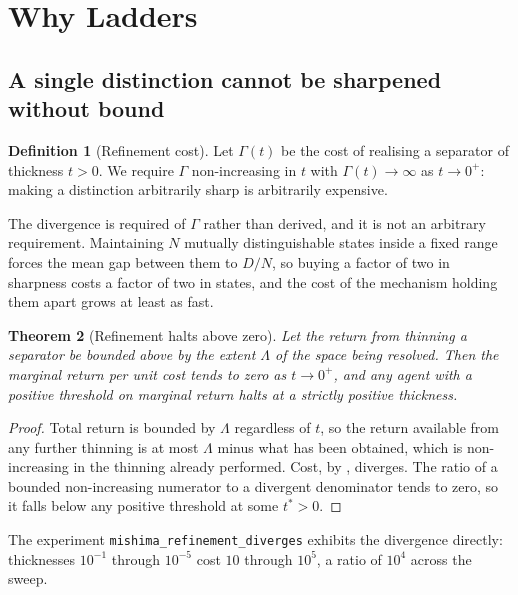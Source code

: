 \documentclass[11pt,twocolumn,a4paper]{article}
\newtheorem{theorem}{Theorem}[section]
\theoremstyle{definition}
\newtheorem{definition}[theorem]{Definition}
\theoremstyle{remark}
\begin{document}
\section{Why Ladders}
\label{sec:nesting}

\subsection{A single distinction cannot be sharpened without bound}

\begin{definition}[Refinement cost]
\label{def:refinecost}
Let $\Gamma(t)$ be the cost of realising a separator of thickness $t>0$. We
require $\Gamma$ non-increasing in $t$ with $\Gamma(t)\to\infty$ as
$t\to0^{+}$: making a distinction arbitrarily sharp is arbitrarily expensive.
\end{definition}

The divergence is required of $\Gamma$ rather than derived, and it is not an
arbitrary requirement. Maintaining $N$ mutually distinguishable states inside a
fixed range forces the mean gap between them to $D/N$, so buying a factor of two
in sharpness costs a factor of two in states, and the cost of the mechanism
holding them apart grows at least as fast.

\begin{theorem}[Refinement halts above zero]
\label{thm:refine}
Let the return from thinning a separator be bounded above by the extent $\Lambda$
of the space being resolved. Then the marginal return per unit cost tends to zero
as $t\to0^{+}$, and any agent with a positive threshold on marginal return halts
at a strictly positive thickness.
\end{theorem}

\begin{proof}
Total return is bounded by $\Lambda$ regardless of $t$, so the return available
from any further thinning is at most $\Lambda$ minus what has been obtained,
which is non-increasing in the thinning already performed. Cost, by
, diverges. The ratio of a bounded non-increasing numerator
to a divergent denominator tends to zero, so it falls below any positive
threshold at some $t^{\ast}>0$.
\end{proof}

The experiment \texttt{mishima\_refinement\_diverges} exhibits the divergence
directly: thicknesses $10^{-1}$ through $10^{-5}$ cost $10$ through $10^{5}$, a
ratio of $10^{4}$ across the sweep.
\end{document}
